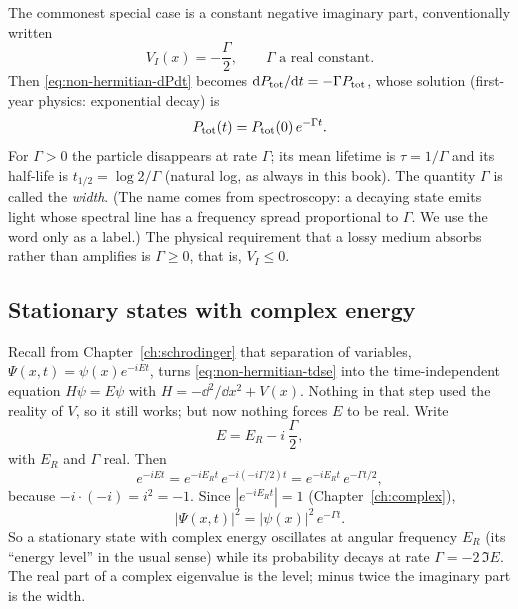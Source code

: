 The commonest special case is a constant negative imaginary part, conventionally written
\begin{equation}
V_I(x) = -\frac{\Gamma}{2}, \qquad \Gamma \text{ a real constant}.
\label{eq:non-hermitian-gamma}
\end{equation}
Then \eqref{eq:non-hermitian-dPdt} becomes $\mathrm{d} P_{\rm tot}/\mathrm{d} t = -\Gamma P_{\rm tot}$, whose solution (first-year physics: exponential decay) is
\begin{equation}
P_{\rm tot}(t) = P_{\rm tot}(0)\,e^{-\Gamma t}.
\label{eq:non-hermitian-expdecay}
\end{equation}
For $\Gamma>0$ the particle disappears at rate $\Gamma$; its mean lifetime is $\tau=1/\Gamma$ and its half-life is $t_{1/2}=\log 2/\Gamma$ (natural log, as always in this book). The quantity $\Gamma$ is called the \emph{width}. (The name comes from spectroscopy: a decaying state emits light whose spectral line has a frequency spread proportional to $\Gamma$. We use the word only as a label.) The physical requirement that a lossy medium absorbs rather than amplifies is $\Gamma\ge0$, that is, $V_I\le0$.

\subsection{Stationary states with complex energy}

Recall from Chapter~\ref{ch:schrodinger} that separation of variables, $\Psi(x,t)=\psi(x)e^{-iEt}$, turns \eqref{eq:non-hermitian-tdse} into the time-independent equation $H\psi=E\psi$ with $H=-\dd^2/\dd x^2+V(x)$. Nothing in that step used the reality of $V$, so it still works; but now nothing forces $E$ to be real. Write
\begin{equation}
E = E_R - i\,\frac{\Gamma}{2},
\label{eq:non-hermitian-complexE}
\end{equation}
with $E_R$ and $\Gamma$ real. Then
\begin{equation}
e^{-iEt} = e^{-iE_R t}\,e^{-i(-i\Gamma/2)t} = e^{-iE_Rt}\,e^{-\Gamma t/2},
\end{equation}
because $-i\cdot(-i)=i^2=-1$. Since $|e^{-iE_Rt}|=1$ (Chapter~\ref{ch:complex}),
\begin{equation}
|\Psi(x,t)|^2 = |\psi(x)|^2\,e^{-\Gamma t}.
\end{equation}
So a stationary state with complex energy oscillates at angular frequency $E_R$ (its ``energy level'' in the usual sense) while its probability decays at rate $\Gamma = -2\,\Im E$. The real part of a complex eigenvalue is the level; minus twice the imaginary part is the width.

